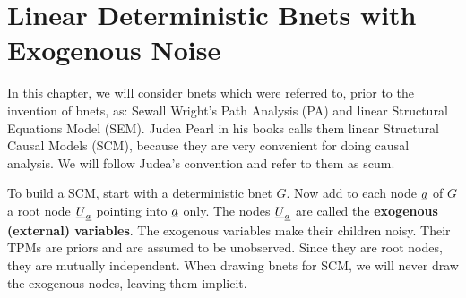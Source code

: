 \chapter{Linear Deterministic Bnets with Exogenous 
Noise}

In this chapter, we will consider 
bnets which were referred to,
prior to the invention of bnets, as:
Sewall Wright's Path Analysis (PA) and
linear Structural Equations Model (SEM).
Judea Pearl in his
books calls them
linear Structural Causal Models (SCM),
because they are very 
convenient for doing causal analysis.
We will follow 
Judea's convention
and refer to them as scum.


To 
build a SCM,
start with a deterministic bnet $G$.
Now  
add to each node ${\underline{a}}$ of $G$ a 
root node ${\underline{U}}_{\underline{a}}$
pointing into ${\underline{a}}$ only.
The nodes ${\underline{U}}_{\underline{a}}$ are called
the {\bf exogenous (external) variables}.
The exogenous
variables make their children noisy.
Their TPMs are
priors and are assumed 
to be unobserved.
Since they are 
root nodes, they are 
mutually independent.
When
drawing
bnets for SCM,
we will
never draw the exogenous nodes,
leaving them implicit.

